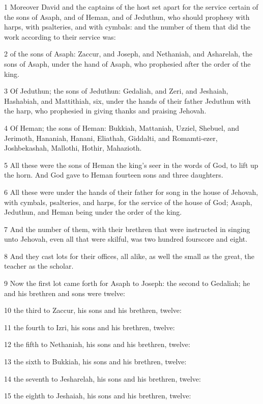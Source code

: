 \par 1 Moreover David and the captains of the host set apart for the service certain of the sons of Asaph, and of Heman, and of Jeduthun, who should prophesy with harps, with psalteries, and with cymbals: and the number of them that did the work according to their service was:
\par 2 of the sons of Asaph: Zaccur, and Joseph, and Nethaniah, and Asharelah, the sons of Asaph, under the hand of Asaph, who prophesied after the order of the king.
\par 3 Of Jeduthun; the sons of Jeduthun: Gedaliah, and Zeri, and Jeshaiah, Hashabiah, and Mattithiah, six, under the hands of their father Jeduthun with the harp, who prophesied in giving thanks and praising Jehovah.
\par 4 Of Heman; the sons of Heman: Bukkiah, Mattaniah, Uzziel, Shebuel, and Jerimoth, Hananiah, Hanani, Eliathah, Giddalti, and Romamti-ezer, Joshbekashah, Mallothi, Hothir, Mahazioth.
\par 5 All these were the sons of Heman the king's seer in the words of God, to lift up the horn. And God gave to Heman fourteen sons and three daughters.
\par 6 All these were under the hands of their father for song in the house of Jehovah, with cymbals, psalteries, and harps, for the service of the house of God; Asaph, Jeduthun, and Heman being under the order of the king.
\par 7 And the number of them, with their brethren that were instructed in singing unto Jehovah, even all that were skilful, was two hundred fourscore and eight.
\par 8 And they cast lots for their offices, all alike, as well the small as the great, the teacher as the scholar.
\par 9 Now the first lot came forth for Asaph to Joseph: the second to Gedaliah; he and his brethren and sons were twelve:
\par 10 the third to Zaccur, his sons and his brethren, twelve:
\par 11 the fourth to Izri, his sons and his brethren, twelve:
\par 12 the fifth to Nethaniah, his sons and his brethren, twelve:
\par 13 the sixth to Bukkiah, his sons and his brethren, twelve:
\par 14 the seventh to Jesharelah, his sons and his brethren, twelve:
\par 15 the eighth to Jeshaiah, his sons and his brethren, twelve:
